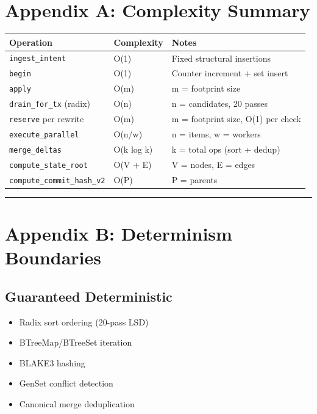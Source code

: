 \documentclass[
]{book}
\newcounter{none} %
\providecommand{\tightlist}{%
  \setlength{\itemsep}{0pt}\setlength{\parskip}{0pt}}
\begin{document}
\section{Appendix A: Complexity
Summary}\label{appendix-a-complexity-summary}

{\def\LTcaptype{none} %
\begin{longtable}[]{@{}lll@{}}
\toprule\noalign{}
Operation & Complexity & Notes \\
\midrule\noalign{}
\endhead
\bottomrule\noalign{}
\endlastfoot
\texttt{ingest\_intent} & O(1) & Fixed structural insertions \\
\texttt{begin} & O(1) & Counter increment + set insert \\
\texttt{apply} & O(m) & m = footprint size \\
\texttt{drain\_for\_tx} (radix) & O(n) & n = candidates, 20 passes \\
\texttt{reserve} per rewrite & O(m) & m = footprint size, O(1) per
check \\
\texttt{execute\_parallel} & O(n/w) & n = items, w = workers \\
\texttt{merge\_deltas} & O(k log k) & k = total ops (sort + dedup) \\
\texttt{compute\_state\_root} & O(V + E) & V = nodes, E = edges \\
\texttt{compute\_commit\_hash\_v2} & O(P) & P = parents \\
\end{longtable}
}

\begin{center}\rule{0.5\linewidth}{0.5pt}\end{center}

\section{Appendix B: Determinism
Boundaries}\label{appendix-b-determinism-boundaries}

\subsection{Guaranteed Deterministic}\label{guaranteed-deterministic}

\begin{itemize}
\tightlist
\item
  Radix sort ordering (20-pass LSD)
\item
  BTreeMap/BTreeSet iteration
\item
  BLAKE3 hashing
\item
  GenSet conflict detection
\item
  Canonical merge deduplication
\end{itemize}
\end{document}
